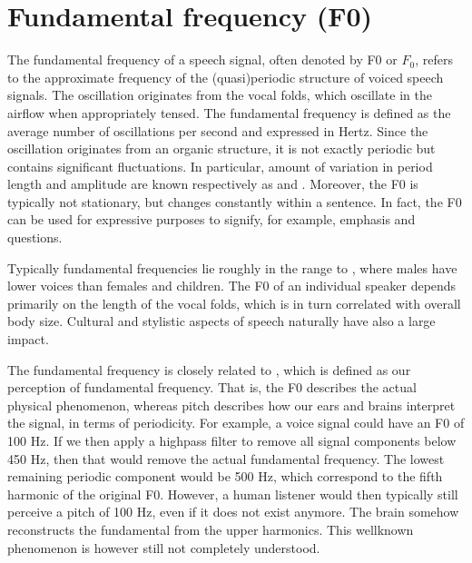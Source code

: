 \documentclass[letterpaper,10pt,english]{jupyterBook}
\begin{document}
\section{Fundamental frequency (F0)}
\label{\detokenize{Representations/Fundamental_frequency_F0:fundamental-frequency-f0}}\label{\detokenize{Representations/Fundamental_frequency_F0::doc}}
\sphinxAtStartPar
The fundamental frequency of a speech signal, often denoted by F0 or
\(F_{0}\), refers to the approximate frequency of the
(quasi\sphinxhyphen{})periodic structure of voiced speech signals. The oscillation
originates from the vocal folds, which oscillate in the airflow when
appropriately tensed. The fundamental frequency is defined as the
average number of oscillations per second and expressed in Hertz. Since
the oscillation originates from an organic structure, it is not exactly
periodic but contains significant fluctuations. In particular, amount of
variation in period length and amplitude are known respectively as
 and . Moreover, the F0 is typically not stationary,
but changes constantly within a sentence. In fact, the F0 can be used
for expressive purposes to signify, for example, emphasis and questions.

\sphinxAtStartPar
Typically fundamental frequencies lie roughly in the range  to , where males have lower voices than females and children. The F0 of
an individual speaker depends primarily on the length of the vocal
folds, which is in turn correlated with overall body size. Cultural and
stylistic aspects of speech naturally have also a large impact.

\sphinxAtStartPar
The fundamental frequency is closely related to , which is
defined as our perception of fundamental frequency. That is, the F0
describes the actual physical phenomenon, whereas pitch describes how
our ears and brains interpret the signal, in terms of periodicity. For
example, a voice signal could have an F0 of 100 Hz. If we then apply a
high\sphinxhyphen{}pass filter to remove all signal components below 450 Hz, then that
would remove the actual fundamental frequency. The lowest remaining
periodic component would be 500 Hz, which correspond to the fifth
harmonic of the original F0. However, a human listener would then
typically still perceive a pitch of 100 Hz, even if it does not exist
anymore. The brain somehow reconstructs the fundamental from the upper
harmonics. This well\sphinxhyphen{}known phenomenon is however still not completely
understood.
\end{document}
